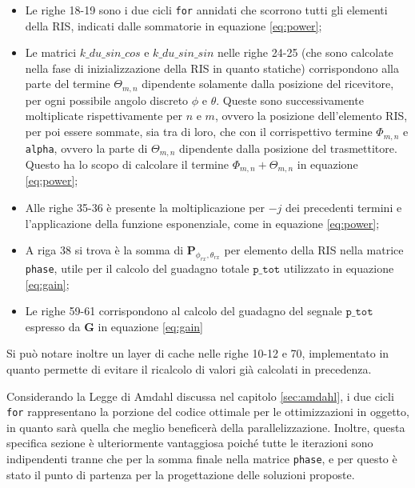 \begin{itemize}
  \item Le righe 18-19 sono i due cicli \texttt{for} annidati che scorrono tutti
    gli elementi della RIS, indicati dalle sommatorie in equazione \ref{eq:power};

  \item Le matrici $k\_du\_sin\_cos$ e $k\_du\_sin\_sin$ nelle righe 24-25 (che
    sono calcolate nella fase di inizializzazione della RIS in quanto statiche) corrispondono
    alla parte del termine $\Theta_{m,n}$ dipendente solamente dalla posizione del
    ricevitore, per ogni possibile angolo discreto $\phi$ e $\theta$. Queste sono
    successivamente moltiplicate rispettivamente per $n$ e $m$, ovvero la
    posizione dell'elemento RIS, per poi essere sommate, sia tra di loro, che con
    il corrispettivo termine $\Phi_{m,n}$ e \texttt{alpha}, ovvero la parte di $\Theta
    _{m,n}$ dipendente dalla posizione del trasmettitore. Questo ha lo scopo di
    calcolare il termine $\Phi_{m,n}+\Theta_{m,n}$ in equazione \ref{eq:power};

  \item Alle righe 35-36 è presente la moltiplicazione per $-j$ dei precedenti termini
    e l'applicazione della funzione esponenziale, come in equazione
    \ref{eq:power};

  \item A riga 38 si trova è la somma di $\textbf{P}_{\phi_{rx},\theta_{rx}}$ per
    elemento della RIS nella matrice \texttt{phase}, utile per il calcolo del guadagno
    totale $\texttt{p\_tot}$ utilizzato in equazione \ref{eq:gain};

  \item Le righe 59-61 corrispondono al calcolo del guadagno del segnale $\texttt
    {p\_tot}$ espresso da $\textbf{G}$ in equazione \ref{eq:gain}
\end{itemize}

Si può notare inoltre un layer di cache nelle righe 10-12 e 70, implementato in
quanto permette di evitare il ricalcolo di valori già calcolati in precedenza.

Considerando la Legge di Amdahl discussa nel capitolo \ref{sec:amdahl}, i due
cicli \texttt{for} rappresentano la porzione del codice ottimale per le
ottimizzazioni in oggetto, in quanto sarà quella che meglio beneficerà della
parallelizzazione. Inoltre, questa specifica sezione è ulteriormente vantaggiosa
poiché tutte le iterazioni sono indipendenti tranne che per la somma finale
nella matrice \texttt{phase}, e per questo è stato il punto di partenza per la
progettazione delle soluzioni proposte.

